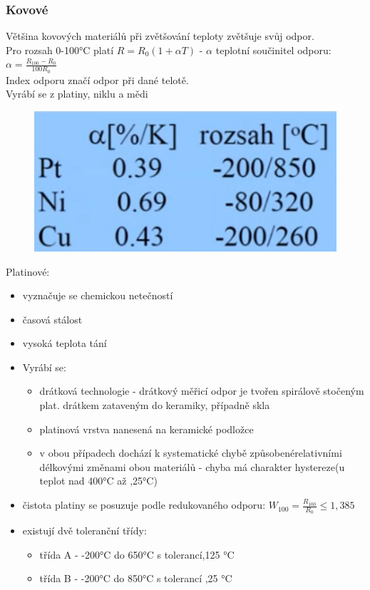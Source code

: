 \subsubsection*{Kovové}
Většina kovových materiálů při zvětšování teploty zvětšuje svůj odpor.\\    
Pro rozsah 0-100°C platí $R = R_0(1+\alpha T)$ - $\alpha$ teplotní součinitel odporu: $\alpha = \frac{R_100-R_0}{100R_0}$\\
Index odporu značí odpor při dané telotě.\\
Vyrábí se z platiny, niklu a mědi\\
\begin{figure}[H]
    \includegraphics*[scale = 0.2]{img/odporoveSnimace.png}
\end{figure}
 Platinové:
 \begin{itemize}
    \item vyznačuje se chemickou netečností
    \item časová stálost
    \item vysoká teplota tání
    \item Vyrábí se:
    \begin{itemize}
        \item drátková technologie - drátkový měřicí odpor je tvořen spirálově stočeným plat. drátkem zataveným do keramiky, případně skla
        \item platinová vrstva nanesená na keramické podložce 
        \item v obou případech dochází k systematické chybě  způsobenérelativními délkovými změnami obou materiálů - chyba má charakter hystereze(u teplot nad 400°C až ,25°C)
    \end{itemize}
    \item čistota platiny se posuzuje podle redukovaného odporu: $W_{100} = \frac{R_{100}}{R_0} \leq 1,385$
    \item existují dvě toleranční třídy:
    \begin{itemize}
        \item třída A - -200°C do 650°C s tolerancí,125 °C 
        \item třída B - -200°C do 850°C s tolerancí ,25 °C 
    \end{itemize}
 \end{itemize}
